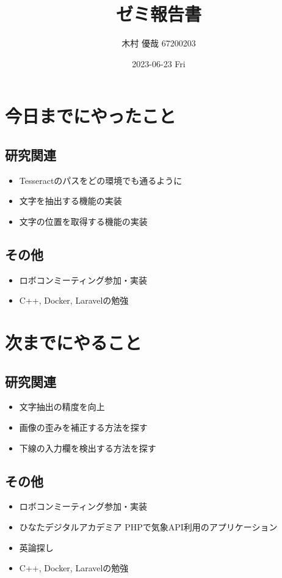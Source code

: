 \documentclass[uplatex, onecolumn, 10pt]{jsarticle}
\begin{document}
\title{\vspace{-40mm}\bf{\LARGE{ゼミ報告書}}}
\author{\vspace{-40mm}木村 優哉 67200203}
\date{2023-06-23 Fri}
\maketitle


\section{今日までにやったこと}

\subsection*{研究関連}
\begin{itemize}
	\item Tesseractのパスをどの環境でも通るように
	\item 文字を抽出する機能の実装
	\item 文字の位置を取得する機能の実装
\end{itemize}

\subsection*{その他}
\begin{itemize}
	\item ロボコンミーティング参加・実装
	\item C++, Docker, Laravelの勉強
\end{itemize}


\section{次までにやること}

\subsection*{研究関連}
\begin{itemize}
	\item 文字抽出の精度を向上
	\item 画像の歪みを補正する方法を探す
	\item 下線の入力欄を検出する方法を探す
\end{itemize}

\subsection*{その他}
\begin{itemize}
	\item ロボコンミーティング参加・実装
	\item ひなたデジタルアカデミア PHPで気象API利用のアプリケーション
	\item 英論探し
	\item C++, Docker, Laravelの勉強
\end{itemize}
\end{document}
